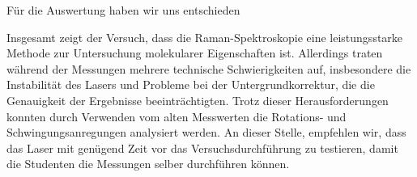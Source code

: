 \documentclass[11pt]{article}
\begin{document}


Für die Auswertung haben wir uns entschieden 

Insgesamt zeigt der Versuch, dass die Raman-Spektroskopie eine leistungsstarke Methode zur Untersuchung molekularer Eigenschaften ist. Allerdings traten während der Messungen mehrere technische Schwierigkeiten auf, insbesondere die Instabilität des Lasers und Probleme bei der Untergrundkorrektur, die die Genauigkeit der Ergebnisse beeinträchtigten. Trotz dieser Herausforderungen konnten durch Verwenden vom alten Messwerten die Rotations- und Schwingungsanregungen  analysiert werden. An dieser Stelle, empfehlen wir, dass das Laser mit genügend Zeit vor das Versuchsdurchführung zu testieren, damit die Studenten die Messungen selber durchführen können. 
\end{document}
